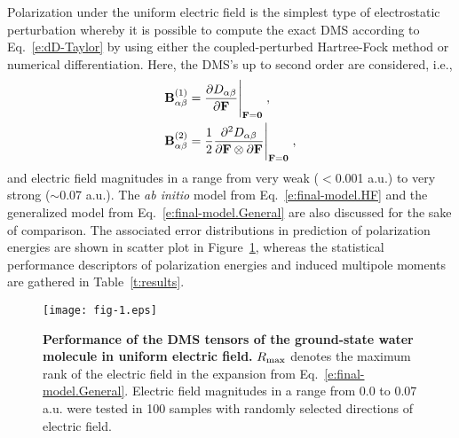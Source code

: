 \documentclass[aip,jcp,preprint,amsmath,amssymb,floatfix]{revtex4-1}
\begin{document}
Polarization under the uniform electric field is the simplest type of electrostatic perturbation
whereby it is possible to compute the exact DMS according to Eq.~\eqref{e:dD-Taylor} 
by using either the coupled\hyp{}perturbed Hartree\hyp{}Fock method\cite{Horn.Head-Gordon.JCP.2015}
or numerical differentiation. Here, the DMS's up to second order are considered, i.e.,
%
\begin{subequations}\label{e:exact-DMS}
 \begin{align}
  {\bf B}^{(1)}_{\alpha\beta} &= \frac{\partial D_{\alpha\beta}}{\partial {\bf F}}\Bigg|_{{\bf F}={\bf 0}} \;, \label{e:B10} \\
  {\bf B}^{(2)}_{\alpha\beta} &= \frac{1}{2} 
     \frac{\partial^2 D_{\alpha\beta}}{\partial {\bf F} \otimes \partial {\bf F}}\Bigg|_{{\bf F}={\bf 0}} \;, \label{e:B20}
 \end{align}
\end{subequations}
%
and electric field magnitudes in a range from very weak ($<$0.001 a.u.) to very strong ($\sim$0.07 a.u.).
The \emph{ab initio} model from Eq.~\eqref{e:final-model.HF} and
the generalized model from Eq.~\eqref{e:final-model.General} are also discussed for the sake of comparison. 
The associated error distributions in prediction of polarization energies 
are shown in scatter plot in Figure~\ref{f:fig-1}, whereas the
statistical performance descriptors of polarization energies and induced multipole moments
are gathered in Table~\ref{t:results}.
%
\begin{figure}[t]
\texttt{[image: fig-1.eps]}
\caption{\label{f:fig-1} {\bf Performance of the DMS tensors of the ground\hyp{}state water molecule
in uniform electric field.} 
$R_{\rm max}$ denotes the maximum rank of the electric field
in the expansion from Eq.~\eqref{e:final-model.General}.
Electric field magnitudes in a range from 0.0 to 0.07 a.u. were tested in 100 samples with randomly selected 
directions of electric field.
} 
\end{figure}
%
\end{document}
